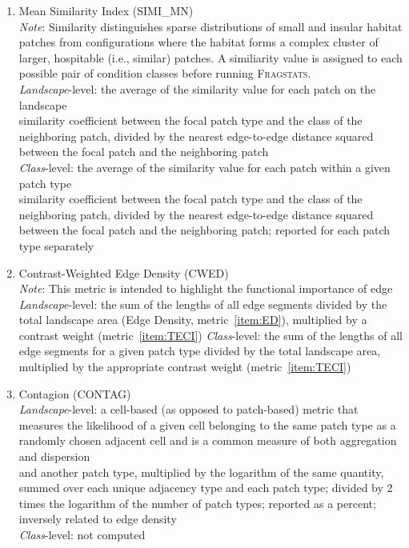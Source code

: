 \begin{enumerate}
	\item Mean Similarity Index (SIMI\_MN)\\
	\emph{Note}: Similarity distinguishes sparse distributions of small and insular habitat patches from configurations where the habitat forms a 
complex cluster of larger, hospitable (i.e., similar) patches. A similiarity value is assigned to each possible pair of condition classes 
before running \textsc{Fragstats}. 	\\
	\emph{Landscape}-level: the average of the similarity value for each patch on the landscape \\
similarity coefficient between the focal patch type and the class of the neighboring patch, divided by the nearest edge-to-edge distance 
squared between the focal patch and the neighboring patch	\\
	\emph{Class}-level: the average of the similarity value for each patch within a given patch type \\
similarity coefficient between the focal patch type and the class of the neighboring patch, divided by the nearest edge-to-edge distance 
squared between the focal patch and the neighboring patch; reported for each patch type separately	\\
	
	\item Contrast-Weighted Edge Density (CWED)\\
	\emph{Note}: This metric is intended to highlight the functional importance of edge	\\
	\emph{Landscape}-level: the sum of the lengths of all edge segments divided by the total landscape area (Edge Density, metric~\ref{item:ED}), 
multiplied by a contrast weight (metric~\ref{item:TECI})
	\emph{Class}-level: the sum of the lengths of all edge segments for a given patch type divided by the total landscape area, multiplied by the 
appropriate contrast weight (metric~\ref{item:TECI})  	\\
	\item Contagion (CONTAG)\\
	\emph{Landscape}-level: a cell-based (as opposed to patch-based) metric that measures the likelihood of a given cell belonging to the same 
patch type as a randomly chosen adjacent cell and is a common measure of both aggregation and dispersion 	\\
and another patch type, multiplied by the logarithm of the same quantity, summed over each unique adjacency type and each patch type; divided 
by 2 times the logarithm of the number of patch types; reported as a percent; inversely related to edge density\\
	\emph{Class}-level: not computed \\ 	
		

\end{enumerate}

